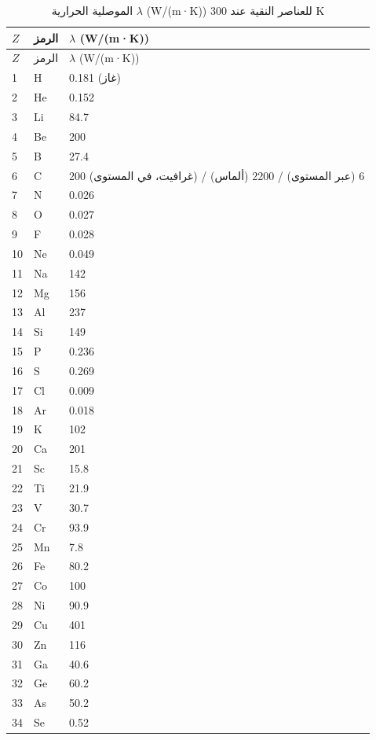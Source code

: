 \documentclass[11pt,a4paper]{article}
\begin{document}
\begin{otherlanguage}{arabic}
		\begin{longtable}{p{0.6cm}p{1.2cm}p{1.5cm}}
			\caption{الموصلية الحرارية \(\lambda\) (W/(m·K)) للعناصر النقية عند 300 K} \label{tab:thermal-conductivity-all} \\
			\toprule
			\(Z\) & الرمز & \(\lambda\) (W/(m·K)) \\
			\midrule
			\endfirsthead
			\toprule
			\(Z\) & الرمز & \(\lambda\) (W/(m·K)) \\
			\midrule
			\endhead
			1  & H  & 0.181 (غاز) \\
			2  & He & 0.152 \\
			3  & Li & 84.7 \\
			4  & Be & 200 \\
			5  & B  & 27.4 \\
			6  & C  & 200 (غرافيت، في المستوى) / 6 (عبر المستوى) / 2200 (ألماس) \\
			7  & N  & 0.026 \\
			8  & O  & 0.027 \\
			9  & F  & 0.028 \\
			10 & Ne & 0.049 \\
			11 & Na & 142 \\
			12 & Mg & 156 \\
			13 & Al & 237 \\
			14 & Si & 149 \\
			15 & P  & 0.236 \\
			16 & S  & 0.269 \\
			17 & Cl & 0.009 \\
			18 & Ar & 0.018 \\
			19 & K  & 102 \\
			20 & Ca & 201 \\
			21 & Sc & 15.8 \\
			22 & Ti & 21.9 \\
			23 & V  & 30.7 \\
			24 & Cr & 93.9 \\
			25 & Mn & 7.8 \\
			26 & Fe & 80.2 \\
			27 & Co & 100 \\
			28 & Ni & 90.9 \\
			29 & Cu & 401 \\
			30 & Zn & 116 \\
			31 & Ga & 40.6 \\
			32 & Ge & 60.2 \\
			33 & As & 50.2 \\
			34 & Se & 0.52 \\

\end{longtable}
\end{otherlanguage}
\end{document}
